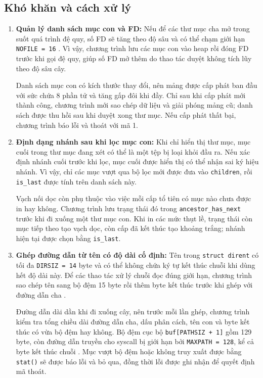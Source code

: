 \subsection{Khó khăn và cách xử lý}
\begin{enumerate}
    \item \textbf{Quản lý danh sách mục con và FD:}
    Nếu để các thư mục cha mở trong suốt quá trình đệ quy, số FD sẽ
    tăng theo độ sâu và có thể chạm giới hạn \texttt{NOFILE = 16}
    \cite{xv6param}. Vì vậy, chương trình lưu các mục con vào heap
    rồi đóng FD trước khi gọi đệ quy, giúp số FD mở thêm do thao tác
    duyệt không tích lũy theo độ sâu cây.

    Danh sách mục con có kích thước thay đổi, nên mảng được cấp phát
    ban đầu với sức chứa 8 phần tử và tăng gấp đôi khi đầy. Chỉ sau
    khi cấp phát mới thành công, chương trình mới sao chép dữ liệu
    và giải phóng mảng cũ; danh sách được thu hồi sau khi duyệt xong
    thư mục. Nếu cấp phát thất bại, chương trình báo lỗi và thoát
    với mã 1.

    \item \textbf{Định dạng nhánh sau khi lọc mục con:}
    Khi chỉ hiển thị thư mục, mục cuối trong thư mục đang xét có thể là
    một tệp bị loại khỏi đầu ra. Nếu xác định nhánh cuối trước khi
    lọc, mục cuối được hiển thị có thể nhận sai ký hiệu nhánh. Vì vậy,
    chỉ các mục vượt qua bộ lọc mới được đưa vào \texttt{children},
    rồi \texttt{is\_last} được tính trên danh sách này.

    Vạch nối dọc còn phụ thuộc vào việc mỗi cấp tổ tiên có mục nào
    chưa được in hay không. Chương trình lưu trạng thái đó trong
    \texttt{ancestor\_has\_next} trước khi đi xuống một thư mục con.
    Khi in các mức thụt lề, trạng thái còn mục tiếp theo tạo vạch
    dọc, còn cấp đã kết thúc tạo khoảng trắng; nhánh hiện tại được
    chọn bằng \texttt{is\_last}.

    \item \textbf{Ghép đường dẫn từ tên có độ dài cố định:}
    Tên trong \texttt{struct dirent} có tối đa \texttt{DIRSIZ = 14}
    byte và có thể không chứa ký tự kết thúc chuỗi khi dùng hết độ
    dài này. Để các thao tác xử lý chuỗi đọc đúng giới hạn, chương
    trình sao chép tên sang bộ đệm 15 byte rồi thêm byte kết thúc
    trước khi ghép với đường dẫn cha \cite{xv6fs,xv6book}.

    Đường dẫn dài dần khi đi xuống cây, nên trước mỗi lần ghép,
    chương trình kiểm tra tổng chiều dài đường dẫn cha, dấu phân
    cách, tên con và byte kết thúc có vừa bộ đệm hay không. Bộ đệm
    cục bộ \texttt{buf[PATHSIZ + 1]} gồm 129 byte, còn đường dẫn
    truyền cho syscall bị giới hạn bởi \texttt{MAXPATH = 128}, kể
    cả byte kết thúc chuỗi \cite{xv6param}. Mục vượt bộ đệm hoặc
    không truy xuất được bằng \texttt{stat()} sẽ được báo lỗi và
    bỏ qua, đồng thời lỗi được ghi nhận để quyết định mã thoát.


\end{enumerate}
